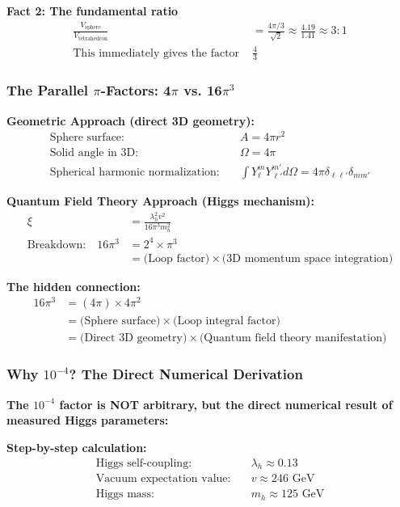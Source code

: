 \documentclass[12pt,a4paper]{article}
\begin{document}
\textbf{Fact 2: The fundamental ratio}
\begin{align}
	\frac{V_{\text{sphere}}}{V_{\text{tetrahedron}}} &= \frac{4\pi/3}{\sqrt{2}} \approx \frac{4.19}{1.41} \approx 3:1 \\
	\text{This immediately gives the factor } &\frac{4}{3}
\end{align}

\subsubsection{The Parallel $\pi$-Factors: 4$\pi$ vs. 16$\pi^3$}
\label{subsubsec:parallel_pi_factors}

\textbf{Geometric Approach (direct 3D geometry):}
\begin{align}
	\text{Sphere surface:} \quad &A = 4\pi r^2 \\
	\text{Solid angle in 3D:} \quad &\Omega = 4\pi \\
	\text{Spherical harmonic normalization:} \quad &\int Y_{\ell}^m Y_{\ell'}^{m'} d\Omega = 4\pi \delta_{\ell\ell'}\delta_{mm'}
\end{align}

\textbf{Quantum Field Theory Approach (Higgs mechanism):}
\begin{align}
	\xi &= \frac{\lambda_h^2 v^2}{16\pi^3 m_h^2} \\
	\text{Breakdown:} \quad 16\pi^3 &= 2^4 \times \pi^3 \\
	&= \text{(Loop factor)} \times \text{(3D momentum space integration)}
\end{align}

\textbf{The hidden connection:}
\begin{align}
	16\pi^3 &= (4\pi) \times 4\pi^2 \\
	&= \text{(Sphere surface)} \times \text{(Loop integral factor)} \\
	&= \text{(Direct 3D geometry)} \times \text{(Quantum field theory manifestation)}
\end{align}

\subsubsection{Why $10^{-4}$? The Direct Numerical Derivation}
\label{subsubsec:direct_numerical_derivation}

\textbf{The $10^{-4}$ factor is NOT arbitrary, but the direct numerical result of measured Higgs parameters:}

\textbf{Step-by-step calculation:}
\begin{align}
	\text{Higgs self-coupling:} \quad &\lambda_h \approx 0.13 \\
	\text{Vacuum expectation value:} \quad &v \approx 246 \text{ GeV} \\
	\text{Higgs mass:} \quad &m_h \approx 125 \text{ GeV}
\end{align}
\end{document}
